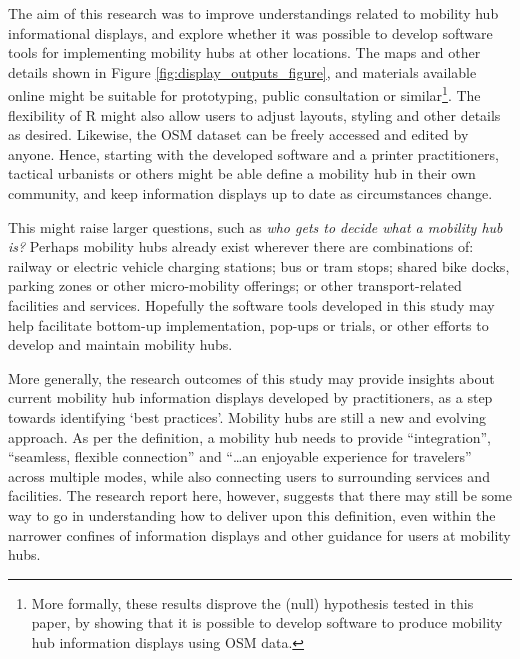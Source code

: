 \documentclass[preprint, 3p,
authoryear]{elsarticle} %
\begin{document}
The aim of this research was to improve understandings related to
mobility hub informational displays, and explore whether it was possible
to develop software tools for implementing mobility hubs at other
locations. The maps and other details shown in Figure
\ref{fig:display_outputs_figure}, and materials available online might
be suitable for prototyping, public consultation or similar\footnote{More
  formally, these results disprove the (null) hypothesis tested in this
  paper, by showing that it is possible to develop software to produce
  mobility hub information displays using OSM data.}. The flexibility of
R might also allow users to adjust layouts, styling and other details as
desired. Likewise, the OSM dataset can be freely accessed and edited by
anyone. Hence, starting with the developed software and a printer
practitioners, tactical urbanists or others might be able define a
mobility hub in their own community, and keep information displays up to
date as circumstances change.

This might raise larger questions, such as \emph{who gets to decide what
a mobility hub is?} Perhaps mobility hubs already exist wherever there
are combinations of: railway or electric vehicle charging stations; bus
or tram stops; shared bike docks, parking zones or other micro-mobility
offerings; or other transport-related facilities and services. Hopefully
the software tools developed in this study may help facilitate bottom-up
implementation, pop-ups or trials, or other efforts to develop and
maintain mobility hubs.

More generally, the research outcomes of this study may provide insights
about current mobility hub information displays developed by
practitioners, as a step towards identifying `best practices'. Mobility
hubs are still a new and evolving approach. As per the
\citet{Roukouni:2023aa} definition, a mobility hub needs to provide
``integration'', ``seamless, flexible connection'' and ``\ldots an
enjoyable experience for travelers'' across multiple modes, while also
connecting users to surrounding services and facilities. The research
report here, however, suggests that there may still be some way to go in
understanding how to deliver upon this definition, even within the
narrower confines of information displays and other guidance for users
at mobility hubs.

\renewcommand\refname{References}

\end{document}
